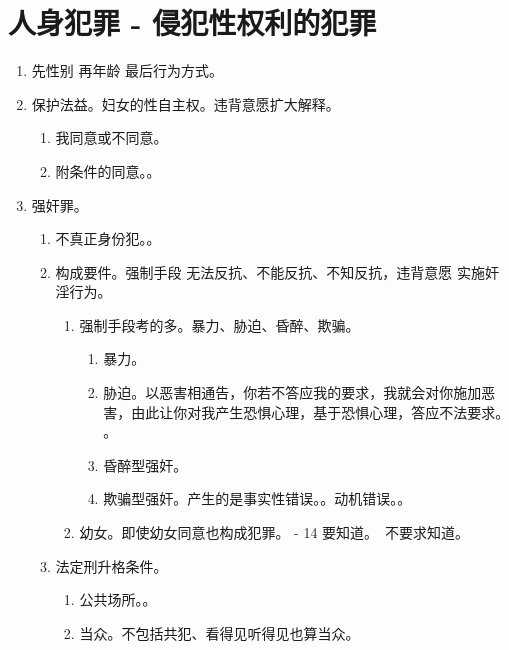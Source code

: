 \section{人身犯罪 - 侵犯性权利的犯罪}
\begin{enumerate}
  \item 先性别 \yjt 再年龄 \yjt 最后行为方式。
  \item 保护法益。妇女的性自主权。违背意愿扩大解释。
        \begin{enumerate}
          \item 我同意或不同意。
          \item 附条件的同意。。
        \end{enumerate}
  \item 强奸罪。
        \begin{enumerate}
          \item 不真正身份犯。。
          \item 构成要件。强制手段 \yjt 无法反抗、不能反抗、不知反抗，违背意愿 \yjt 实施奸淫行为。
                \begin{enumerate}
                  \item 强制手段考的多。暴力、胁迫、昏醉、欺骗。
                        \begin{enumerate}
                          \item 暴力。
                          \item 胁迫。以恶害相通告，你若不答应我的要求，我就会对你施加恶害，由此让你对我产生恐惧心理，基于恐惧心理，答应不法要求。
                                。
                          \item 昏醉型强奸。
                          \item 欺骗型强奸。产生的是事实性错误。。动机错误。。
                        \end{enumerate}
                  \item 幼女。即使幼女同意也构成犯罪。 - 14 要知道。\er\,  不要求知道。
                \end{enumerate}
          \item 法定刑升格条件。
                \begin{enumerate}
                  \item 公共场所。。
                  \item 当众。不包括共犯、看得见听得见也算当众。

\end{enumerate}
\end{enumerate}
\end{enumerate}
